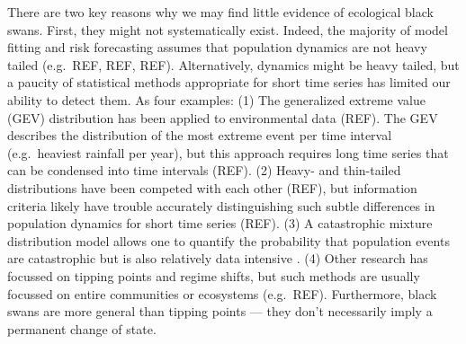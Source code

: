 There are two key reasons why we may find little evidence of ecological black
swans. First, they might not systematically exist. Indeed, the majority of
model fitting and risk forecasting assumes that population
dynamics are not heavy tailed (e.g.~REF, REF, REF).
Alternatively, dynamics might be heavy tailed, but a paucity of statistical
methods appropriate for short time series has limited our
ability to detect them.
As four examples: (1) The generalized extreme value (GEV) distribution has been
applied to environmental data (REF).
The GEV describes the distribution of the most extreme
event per time interval (e.g.~heaviest rainfall per year), but this approach
requires long time series that can be condensed into time intervals (REF).
(2) Heavy- and thin-tailed distributions have been competed with each
other (REF), but information criteria likely have
trouble accurately distinguishing such subtle differences in population
dynamics for short time series (REF).
(3) A catastrophic mixture distribution model allows one to quantify the
probability that population events are catastrophic but is also relatively data
intensive \citep{ward2007}.
(4) Other research has focussed on tipping points and regime shifts, but such
methods are usually focussed on entire communities or ecosystems (e.g.\ REF).
Furthermore, black swans are more general than tipping points --- they don't
necessarily imply a permanent change of state.


